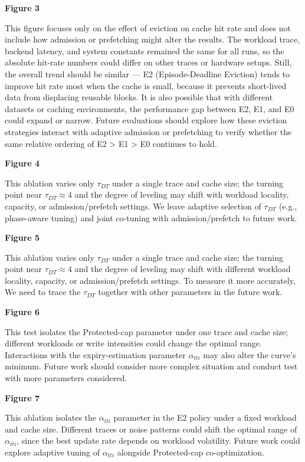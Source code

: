 \textbf{Figure 3}

This figure focuses only on the effect of eviction on cache hit rate and does not include how admission or prefetching might alter the results. 
The workload trace, backend latency, and system constants remained the same for all runs, so the absolute hit-rate numbers could differ on other traces or hardware setups. 
Still, the overall trend should be similar — E2 (Episode-Deadline Eviction) tends to improve hit rate most when the cache is small, because it prevents short-lived data from displacing reusable blocks. 
It is also possible that with different datasets or caching environments, the performance gap between E2, E1, and E0 could expand or narrow. 
Future evaluations should explore how these eviction strategies interact with adaptive admission or prefetching to verify whether the same relative ordering of E2 > E1 > E0 continues to hold.




\textbf{Figure 4}

This ablation varies only $\tau_{DT}$ under a single trace and cache size; the turning point near $\tau_{DT}\approx4$ and the degree of leveling may shift with workload locality, capacity, or admission/prefetch settings. 
We leave adaptive selection of $\tau_{DT}$ (e.g., phase-aware tuning) and joint co-tuning with admission/prefetch to future work.

\textbf{Figure 5}

This ablation varies only $\tau_{DT}$ under a single trace and cache size; the turning point near $\tau_{DT}\approx4$ and the degree of leveling may shift with different workload locality, capacity, or admission/prefetch settings. 
To measure it more accurately, We need to trace the $\tau_{DT}$ together with other parameters in the future work.


\textbf{Figure 6}

This test isolates the Protected-cap parameter under one trace and cache size; different workloads or write intensities could change the optimal range.  
Interactions with the expiry-estimation parameter $\alpha_{tti}$ may also alter the curve’s minimum.  
Future work should consider more complex situation and conduct test with more parameters considered.

\textbf{Figure 7}

This ablation isolates the $\alpha_{tti}$ parameter in the E2 policy under a fixed workload and cache size. 
Different traces or noise patterns could shift the optimal range of $\alpha_{tti}$, 
since the best update rate depends on workload volatility. 
Future work could explore adaptive tuning of $\alpha_{tti}$ alongside Protected-cap co-optimization.

